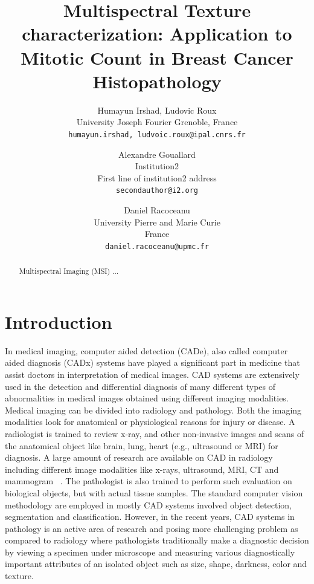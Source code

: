 \documentclass[10pt,twocolumn,letterpaper]{article}
\begin{document}
\title{Multispectral Texture characterization: Application to Mitotic Count in Breast Cancer Histopathology}

\author{Humayun Irshad, Ludovic Roux\\
University Joseph Fourier Grenoble, France\\
{\tt\small {humayun.irshad, ludvoic.roux}@ipal.cnrs.fr} \\
\and 
Alexandre Gouallard\\
Institution2\\
First line of institution2 address\\
{\tt\small secondauthor@i2.org} \\
\and
Daniel Racoceanu\\
University Pierre and Marie Curie\\
France\\
{\tt\small daniel.racoceanu@upmc.fr}
}

\maketitle

\begin{abstract}
Multispectral Imaging (MSI) ...
\end{abstract}

\section{Introduction}

In medical imaging, computer aided detection (CADe), also called computer aided diagnosis (CADx) systems have played a significant part in medicine that assist doctors in interpretation of medical images. CAD systems are extensively used in the detection and differential diagnosis of many different types of abnormalities in medical images obtained using different imaging modalities. Medical imaging can be divided into radiology and pathology. Both the imaging modalities look for anatomical or physiological reasons for injury or disease. A radiologist is trained to review x-ray, and other non-invasive images and scans of the anatomical object like brain, lung, heart (e.g., ultrasound or MRI) for diagnosis. A large amount of research are available on CAD in radiology including different image modalities like x-rays, ultrasound, MRI, CT and mammogram ~\cite{sonka2000,bankman2000,erickson2002,summers2003,giger2004}. The pathologist is also trained to perform such evaluation on biological objects, but with actual tissue samples. The standard computer vision methodology are employed in mostly CAD systems involved object detection, segmentation and classification. However, in the recent years, CAD systems in pathology is an active area of research and posing more challenging problem as compared to radiology where pathologists traditionally make a diagnostic decision by viewing a specimen under microscope and measuring various diagnostically important attributes of an isolated object such as size, shape, darkness, color and texture.
\end{document}
